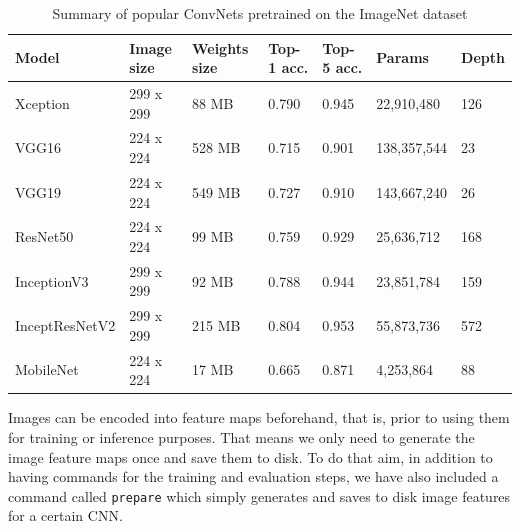 
\begin{table}[hpt]
\caption{Summary of  popular ConvNets pretrained on the ImageNet dataset}
\label{tab:popular-convnets}
\begin{tabular}{lllllll}
Model & Image size & Weights size & Top-1 acc. & Top-5 acc. & Params & Depth \\
\hline
Xception & 299 x 299 & 88 MB & 0.790 & 0.945 & 22,910,480 & 126 \\
VGG16 & 224 x 224 & 528 MB & 0.715 & 0.901 & 138,357,544 & 23 \\
VGG19 & 224 x 224 & 549 MB & 0.727 & 0.910 & 143,667,240 & 26 \\
ResNet50 & 224 x 224 & 99 MB & 0.759 & 0.929 & 25,636,712 & 168 \\
InceptionV3 & 299 x 299 & 92 MB & 0.788 & 0.944 & 23,851,784 & 159 \\
InceptResNetV2 & 299 x 299 & 215 MB & 0.804 & 0.953 & 55,873,736 & 572 \\
MobileNet & 224 x 224 & 17 MB & 0.665 & 0.871 & 4,253,864 & 88 
\end{tabular}
\end{table}

Images can be encoded into feature maps beforehand, that is, prior to using them for training or inference purposes. That means we only need to generate the image feature maps once and save them to disk. To do that aim, in addition to having commands for the training and evaluation steps, we have also included a command called \lstinline{prepare} which simply generates and saves to disk image features for a certain CNN. 

